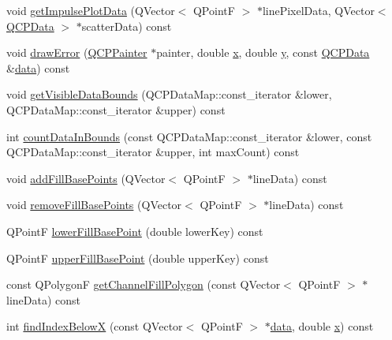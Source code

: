 \begin{DoxyCompactItemize}
\item 
void \hyperlink{class_q_c_p_graph_a1ca2b0762505767f116892609fb02062}{get\+Impulse\+Plot\+Data} (Q\+Vector$<$ Q\+Point\+F $>$ $\ast$line\+Pixel\+Data, Q\+Vector$<$ \hyperlink{class_q_c_p_data}{Q\+C\+P\+Data} $>$ $\ast$scatter\+Data) const 
\item 
void \hyperlink{class_q_c_p_graph_a4df6807066ce877705e999773e7ffbc4}{draw\+Error} (\hyperlink{class_q_c_p_painter}{Q\+C\+P\+Painter} $\ast$painter, double \hyperlink{_v_s_a___u_t_2_comparision_pictures_2_createtest_image_8m_a9336ebf25087d91c818ee6e9ec29f8c1}{x}, double \hyperlink{_v_s_a___u_t_2_comparision_pictures_2_createtest_image_8m_a2fb1c5cf58867b5bbc9a1b145a86f3a0}{y}, const \hyperlink{class_q_c_p_data}{Q\+C\+P\+Data} \&\hyperlink{class_q_c_p_graph_a2f58436df4f86a2792b776a21642b3d9}{data}) const 
\item 
void \hyperlink{class_q_c_p_graph_a6a317cb14a83dae0841c7041a63d6d9d}{get\+Visible\+Data\+Bounds} (Q\+C\+P\+Data\+Map\+::const\+\_\+iterator \&lower, Q\+C\+P\+Data\+Map\+::const\+\_\+iterator \&upper) const 
\item 
int \hyperlink{class_q_c_p_graph_a13f6a3aa60227e03ab1f7aa8eec6589f}{count\+Data\+In\+Bounds} (const Q\+C\+P\+Data\+Map\+::const\+\_\+iterator \&lower, const Q\+C\+P\+Data\+Map\+::const\+\_\+iterator \&upper, int max\+Count) const 
\item 
void \hyperlink{class_q_c_p_graph_a5fa7884620d7c54b81dfbd255d97b636}{add\+Fill\+Base\+Points} (Q\+Vector$<$ Q\+Point\+F $>$ $\ast$line\+Data) const 
\item 
void \hyperlink{class_q_c_p_graph_ad31b49a90e91e538fd9caf011c913a68}{remove\+Fill\+Base\+Points} (Q\+Vector$<$ Q\+Point\+F $>$ $\ast$line\+Data) const 
\item 
Q\+Point\+F \hyperlink{class_q_c_p_graph_a41f982e8ceaefe6a53eb7432f26d64b6}{lower\+Fill\+Base\+Point} (double lower\+Key) const 
\item 
Q\+Point\+F \hyperlink{class_q_c_p_graph_a363d066c179e0f46cc93c12bafb0bfba}{upper\+Fill\+Base\+Point} (double upper\+Key) const 
\item 
const Q\+Polygon\+F \hyperlink{class_q_c_p_graph_a0374b7268e35cab9802a6be2b5d726d7}{get\+Channel\+Fill\+Polygon} (const Q\+Vector$<$ Q\+Point\+F $>$ $\ast$line\+Data) const 
\item 
int \hyperlink{class_q_c_p_graph_a6f4e9461d5925be9228fc4760249a04f}{find\+Index\+Below\+X} (const Q\+Vector$<$ Q\+Point\+F $>$ $\ast$\hyperlink{class_q_c_p_graph_a2f58436df4f86a2792b776a21642b3d9}{data}, double \hyperlink{_v_s_a___u_t_2_comparision_pictures_2_createtest_image_8m_a9336ebf25087d91c818ee6e9ec29f8c1}{x}) const 

\end{DoxyCompactItemize}
